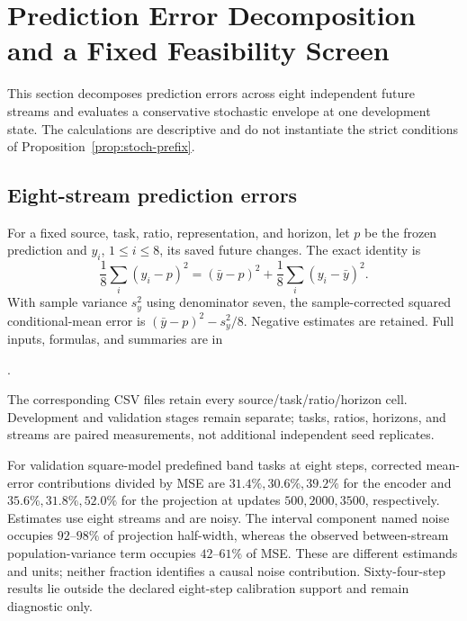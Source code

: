 \section{Prediction Error Decomposition and a Fixed Feasibility Screen}
\label{supp:stochastic-checks}
This section decomposes prediction errors across eight independent future streams and evaluates a conservative stochastic envelope at one development state. The calculations are descriptive and do not instantiate the strict conditions of Proposition~\ref{prop:stoch-prefix}.

\subsection{Eight-stream prediction errors}
For a fixed source, task, ratio, representation, and horizon, let $p$ be the frozen prediction and $y_i$, $1\le i\le8$, its saved future changes. The exact identity is
\begin{equation}
 \frac18\sum_i(y_i-p)^2=(\bar y-p)^2
                    +\frac18\sum_i(y_i-\bar y)^2.
\end{equation}
With sample variance $s_y^2$ using denominator seven, the sample-corrected squared conditional-mean error is $(\bar y-p)^2-s_y^2/8$. Negative estimates are retained. Full inputs, formulas, and summaries are in
\begin{center}
.
\end{center}
The corresponding CSV files retain every source/task/ratio/horizon cell. Development and validation stages remain separate; tasks, ratios, horizons, and streams are paired measurements, not additional independent seed replicates.

For validation square-model predefined band tasks at eight steps, corrected mean-error contributions divided by MSE are $31.4\%,30.6\%,39.2\%$ for the encoder and $35.6\%,31.8\%,52.0\%$ for the projection at updates $500,2000,3500$, respectively. Estimates use eight streams and are noisy. The interval component named noise occupies $92$--$98\%$ of projection half-width, whereas the observed between-stream population-variance term occupies $42$--$61\%$ of MSE. These are different estimands and units; neither fraction identifies a causal noise contribution. Sixty-four-step results lie outside the declared eight-step calibration support and remain diagnostic only.

